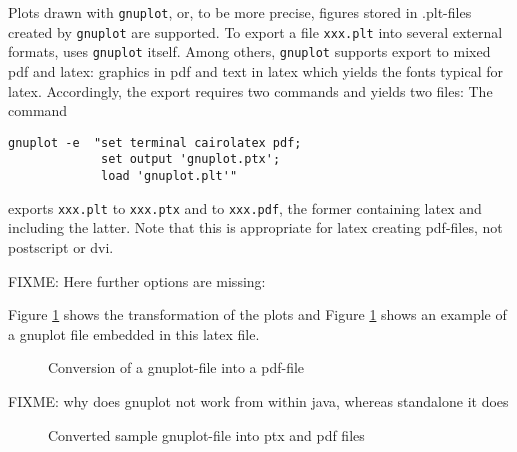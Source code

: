 \documentclass[12pt]{article}
\begin{document}
Plots drawn with {\tt gnuplot}, or, to be more precise, 
figures stored in .plt-files created by {\tt gnuplot} are supported. 
To export a file {\tt xxx.plt} into several external formats, 
uses {\tt gnuplot} itself. 
Among others, {\tt gnuplot} supports export to mixed pdf and latex: 
graphics in pdf and text in latex which yields the fonts typical for latex. 
Accordingly, the export requires two commands and yields two files: 
The command 
%
\begin{verbatim}
gnuplot -e  "set terminal cairolatex pdf;
             set output 'gnuplot.ptx';
             load 'gnuplot.plt'"
\end{verbatim}
%
exports {\tt xxx.plt} to {\tt xxx.ptx} and to {\tt xxx.pdf}, 
the former containing latex and including the latter. 
Note that this is appropriate for latex creating pdf-files, 
not postscript or dvi. 

FIXME: 
Here further options are missing: 

Figure \ref{fig:plt2pdf} shows the transformation of the plots 
and Figure \ref{fig:plt2pdf} shows an example of a gnuplot file 
embedded in this latex file. 

\begin{figure}[htb]
\begin{center}

\end{center}
\caption{\label{fig:plt2pdf}Conversion of a gnuplot-file into a pdf-file}
\end{figure}

FIXME: why does gnuplot not work from within java, whereas standalone it does 

\begin{figure}[htb]
\begin{center}
%
\end{center}
\caption{\label{fig:gnuplot}
Converted sample gnuplot-file into ptx and pdf files }
\end{figure}
\end{document}

